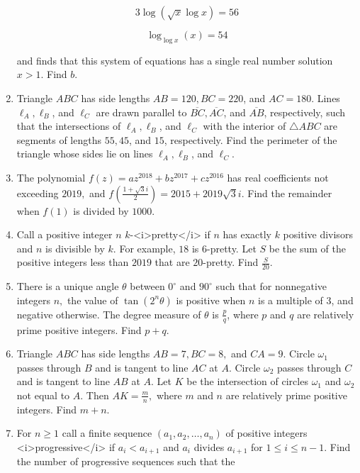 \documentclass{article}
\begin{document}
\begin{enumerate}[label=\arabic*., itemsep=0.5em]
\begin{equation*}
3\log(\sqrt{x}\log x)=56
\end{equation*}


\begin{equation*}
\log_{\log x}(x)=54
\end{equation*}

and finds that this system of equations has a single real number solution \(x>1\). Find \(b\).\par \vspace{0.5em}\item Triangle \(ABC\) has side lengths \(AB=120,BC=220\), and \(AC=180\). Lines \(\ell_A,\ell_B\), and \(\ell_C\) are drawn parallel to \(\overline{BC},\overline{AC}\), and \(\overline{AB}\), respectively, such that the intersections of \(\ell_A,\ell_B\), and \(\ell_C\) with the interior of \(\triangle ABC\) are segments of lengths \(55,45\), and \(15\), respectively. Find the perimeter of the triangle whose sides lie on lines \(\ell_A,\ell_B\), and \(\ell_C\).\par \vspace{0.5em}\item The polynomial \(f(z)=az^{2018}+bz^{2017}+cz^{2016}\) has real coefficients not exceeding \(2019,\) and \(f\left(\tfrac{1+\sqrt3i}{2}\right)=2015+2019\sqrt3i\). Find the remainder when \(f(1)\) is divided by \(1000\).\par \vspace{0.5em}\item Call a positive integer \(n\) \(k\)-<i>pretty</i> if \(n\) has exactly \(k\) positive divisors and \(n\) is divisible by \(k\). For example, \(18\) is \(6\)-pretty. Let \(S\) be the sum of the positive integers less than \(2019\) that are \(20\)-pretty. Find \(\tfrac{S}{20}\).\par \vspace{0.5em}\item There is a unique angle \(\theta\) between \(0^\circ\) and \(90^\circ\) such that for nonnegative integers \(n,\) the value of \(\tan(2^n\theta)\) is positive when \(n\) is a multiple of \(3\), and negative otherwise. The degree measure of \(\theta\) is \(\tfrac{p}{q}\), where \(p\) and \(q\) are relatively prime positive integers. Find \(p+q\).\par \vspace{0.5em}\item Triangle \(ABC\) has side lengths \(AB=7,BC=8,\) and \(CA=9.\) Circle \(\omega_1\) passes through \(B\) and is tangent to line \(AC\) at \(A.\) Circle \(\omega_2\) passes through \(C\) and is tangent to line \(AB\) at \(A.\) Let \(K\) be the intersection of circles \(\omega_1\) and \(\omega_2\) not equal to \(A.\) Then \(AK=\tfrac{m}{n},\) where \(m\) and \(n\) are relatively prime positive integers. Find \(m+n.\)\par \vspace{0.5em}\item For \(n\ge1\) call a finite sequence \((a_1,a_2,\ldots,a_n)\) of positive integers <i>progressive</i> if \(a_i<a_{i+1}\) and \(a_i\) divides \(a_{i+1}\) for \(1\le i\le n-1\). Find the number of progressive sequences such that the 
\end{enumerate}
\end{document}
